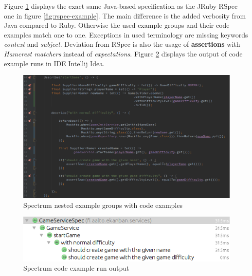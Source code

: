     Figure \ref{fig:spectrum-example} displays the exact same Java-based specification as the JRuby RSpec one in figure \ref{fig:rspec-example}.
    The main difference is the added verbosity from Java compared to Ruby. Otherwise the used example groups and their code examples
    match one to one. Exceptions in used terminology are missing keywords \textit{context} and \textit{subject}.
    Deviation from RSpec is also the usage of \textbf{assertions} with \textit{Hamcrest matchers} instead of \textit{expectations}.
    Figure \ref{fig:spectrum-result}
    displays the output of code example runs in IDE Intellij Idea.
    \begin{figure}[ht]
      \begin{center}
        \includegraphics[width=13.7cm]{images/spectrum-example.png}
        \caption{Spectrum nested example groups with code examples}
        \label{fig:spectrum-example}
      \end{center}
    \end{figure}
    \begin{figure}[ht]
      \begin{center}
        \includegraphics[width=13.7cm]{images/spectrum-result.png}
        \caption{Spectrum code example run output}
        \label{fig:spectrum-result}
      \end{center}
    \end{figure}

